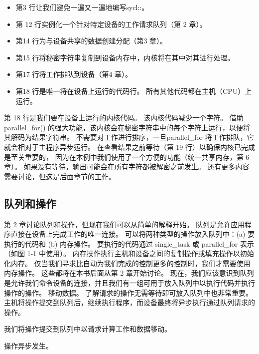 \begin{itemize}
	\item 第3 行让我们避免一遍又一遍地编写sycl::。

	\item 第 12 行实例化一个针对特定设备的工作请求队列（第 2 章）。

	\item 第14 行为与设备共享的数据创建分配（第3 章）。

	\item 第15 行将秘密字符串复制到设备内存中，内核将在其中对其进行处理。

	\item 第17 行将工作排队到设备（第4 章）。

	\item 第18 行是唯一将在设备上运行的代码行。 所有其他代码都在主机（CPU）上运行。
\end{itemize}

第 18 行是我们要在设备上运行的内核代码。 该内核代码减少一个字符。 
借助parallel\_for() 的强大功能，该内核会在秘密字符串中的每个字符上运行，以便将其解码为结果字符串。 
不需要对工作进行排序，一旦parallel\_for 将工作排队，它就会相对于主程序异步运行。 
在查看结果之前等待（第 19 行）以确保内核已完成是至关重要的，
因为在本例中我们使用了一个方便的功能（统一共享内存，第 6 章）。 
如果没有等待，输出可能会在所有字符都被解密之前发生。 还有更多内容需要讨论，但这是后面章节的工作。

\subsection{队列和操作}
第 2 章讨论队列和操作，但现在我们可以从简单的解释开始。 队列是允许应用程序直接在设备上完成工作的唯一连接。 
可以将两种类型的操作放入队列中：(a) 要执行的代码和 (b) 内存操作。 
要执行的代码通过 single\_task 或 parallel\_for 表示（如图 1-1 中使用）。 
内存操作执行主机和设备之间的复制操作或填充操作以初始化内存。 
仅当我们寻求比自动为我们完成的控制更多的控制时，我们才需要使用内存操作。 这些都将在本书后面从第 2 章开始讨论。
现在，我们应该意识到队列是允许我们命令设备的连接，并且我们有一组可用于放入队列中以执行代码并执行操作的操作。 
移动数据。 了解请求的操作无需等待即可放入队列中也非常重要。 
主机将操作提交到队列后，继续执行程序，而设备最终将异步执行通过队列请求的操作。

\begin{remark}[队列将我们与设备连接起来]
我们将操作提交到队列中以请求计算工作和数据移动。
	
操作异步发生。
\end{remark}


